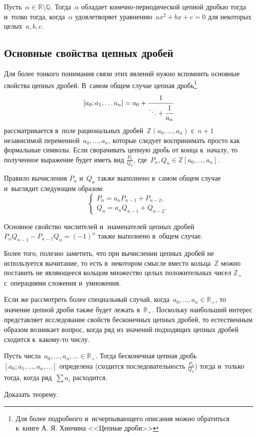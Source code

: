 \documentclass{article}
\begin{document}
\begin{theorem}[Лагранжа]
  Пусть~$\alpha \in \mathbb{R} \setminus \mathbb{Q}$. Тогда~$\alpha$ обладает
  конечно-периодической цепной дробью тогда и~толко тогда, когда~$\alpha$
  удовлетворяет уравнению~$ax^2 + bx + c = 0$ для некоторых целых~$a, b, c$.
\end{theorem}

\subsection{Основные свойства цепных дробей}

Для более тонкого понимания связи этих явлений нужно вспомнить основные свойства
цепных дробей. В~самом общем случае цепная дробь\footnote{Для более подробного
и~исчерпывающего описания можно обратиться к~книге А. Я. Хинчина <<Цепные
дроби>>} $$[a_0; a_1, \ldots a_n] = a_0 + \cfrac{1}{\ddots + \cfrac{1}{a_n}}$$
рассматривается в~поле рациональных дробей~$\mathbb{Z}(a_0,\ldots,a_n)$
с~$n + 1$ независимой переменной~$a_0, \ldots, a_n$, которые следует
воспринимать просто как формальные символы. Если сворачивать цепную дробь
от конца к~началу, то полученное выражение будет иметь вид $\frac{P_n}{Q_n}$,
где~$P_n,Q_n \in \mathbb{Z}[a_0,\ldots,a_n]$.

Правило вычисления $P_n$ и~$Q_n$ также выполнено в~самом общем случае и~выглядит
следующим образом:
$$
\begin{cases}
  P_n = a_n P_{n-1} + P_{n-2},\\
  Q_n = a_n Q_{n-1} + Q_{n-2}.
\end{cases}
$$

Основное свойство числителей и~знаменателей цепных дробей~$P_n Q_{n-1} - P_{n-1}
Q_n = (-1)^n$ также выполнено в~общем случае.

Более того, полезно заметить, что при вычислении цепных дробей не используется
вычитание, то есть в~некотором смысле вместо кольца~$\mathbb{Z}$ можно поставить
не являющееся кольцом множество целых положительных чисел $\mathbb{Z}_+$
с~операциями сложения и~умножения.

Если же рассмотреть более специальный случай, когда~$a_0, \ldots, a_n \in
\mathbb{R}_+$, то значение цепной дроби также будет лежать в~$\mathbb{R}_+$.
Поскольку наибольший интерес представляет исследование свойств бесконечных
цепных дробей, то естественным образом возникает вопрос, когда ряд из значений
подходящих цепных дробей сходится к~какому-то числу.

\begin{theorem}
  Пусть числа~$a_0, \ldots, a_n, \ldots \in \mathbb{R}_+$. Тогда бесконечная
  цепная дробь~$[a_0; a_1, \ldots, a_n, \ldots]$ определена (сходится
  последовательность $\frac{P_n}{Q_n}$) тогда и~только тогда, когда
  ряд~$\sum a_i$ расходится.
\end{theorem}
\begin{exercise}[сложное]
  Доказать теорему.
\end{exercise}
\end{document}
